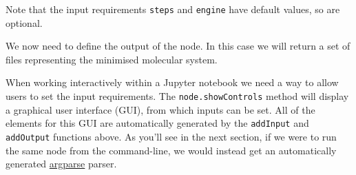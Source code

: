 \begin{Shaded}
\begin{Highlighting}[]
    \OperatorTok{=}\NormalTok{)}
\NormalTok{)}

    \OperatorTok{=}\NormalTok{,}
\OperatorTok{=}\NormalTok{,}
\OperatorTok{=}\NormalTok{,}
\OperatorTok{=}\NormalTok{)}
\NormalTok{)}

    \OperatorTok{=}\NormalTok{,}
\OperatorTok{=}
\OperatorTok{=}\NormalTok{)}
\NormalTok{)}
\end{Highlighting}
\end{Shaded}

Note that the input requirements \texttt{steps} and \texttt{engine} have
default values, so are optional.

We now need to define the output of the node. In this case we will
return a set of files representing the minimised molecular system.

\begin{Shaded}
\begin{Highlighting}[]
\OperatorTok{=}\NormalTok{))}
\end{Highlighting}
\end{Shaded}

When working interactively within a Jupyter notebook we need a way to
allow users to set the input requirements. The
\texttt{node.showControls} method will display a graphical user
interface (GUI), from which inputs can be set. All of the elements for
this GUI are automatically generated by the \texttt{addInput} and
\texttt{addOutput} functions above. As you'll see in the next section,
if we were to run the same node from the command-line, we would instead
get an automatically generated
\href{https://docs.python.org/3/library/argparse.html}{argparse} parser.

